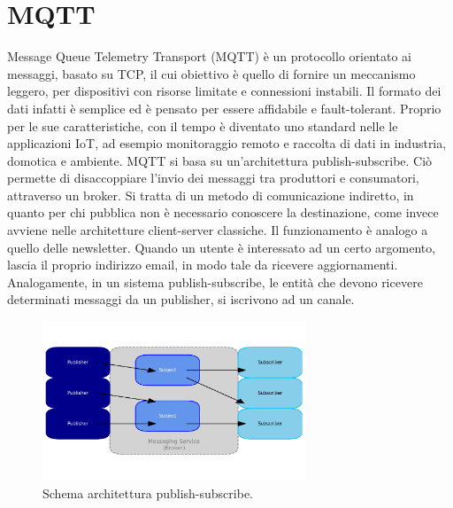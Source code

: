 \section{MQTT} %
Message Queue Telemetry Transport (MQTT) è un protocollo orientato ai messaggi, basato su TCP, il cui obiettivo è quello di fornire un meccanismo leggero, per dispositivi con risorse limitate e connessioni instabili. Il formato dei dati infatti è semplice ed è pensato per essere affidabile e fault-tolerant. Proprio per le sue caratteristiche, con il tempo è diventato uno standard nelle le applicazioni IoT, ad esempio monitoraggio remoto e raccolta di dati in industria, domotica e ambiente. MQTT si basa su un'architettura publish-subscribe. Ciò permette di disaccoppiare l'invio dei messaggi tra produttori e consumatori, attraverso un broker. Si tratta di un metodo di comunicazione indiretto, in quanto per chi pubblica non è necessario conoscere la destinazione, come invece avviene nelle architetture client-server classiche. Il funzionamento è analogo a quello delle newsletter. Quando un utente è interessato ad un certo argomento, lascia il proprio indirizzo email, in modo tale da ricevere aggiornamenti. Analogamente, in un sistema publish-subscribe, le entità che devono ricevere determinati messaggi da un publisher, si iscrivono ad un canale. 

\begin{figure}[htbp]
    \centering
    \includegraphics[width=0.7\textwidth]{figures/pub-sub-arch.png}
    \caption{Schema architettura publish-subscribe.}
    \label{fig:pub-sub}
\end{figure}

